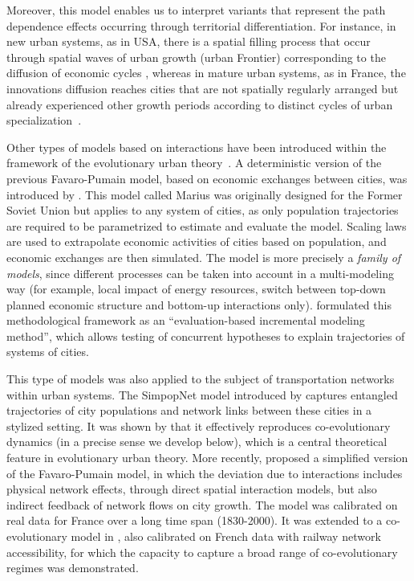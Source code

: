 \documentclass[11pt]{article}
\begin{document}
Moreover, this model enables us to interpret variants that represent the path dependence effects occurring through territorial differentiation. For instance, in new urban systems, as in USA, there is a spatial filling process that occur through spatial waves of urban growth (urban Frontier) corresponding to the diffusion of economic cycles \cite{bretagnolle2007formes}, whereas in mature urban systems, as in France, the innovations diffusion reaches cities that are not spatially regularly arranged but already experienced other growth periods according to distinct cycles of urban specialization~\cite{paulus2004coevolution,finance2016villes}.

Other types of models based on interactions have been introduced within the framework of the evolutionary urban theory~\cite{pumain2006evolutionary}. A deterministic version of the previous Favaro-Pumain model, based on economic exchanges between cities, was introduced by \cite{cottineau2014evolution}. This model called Marius was originally designed for the Former Soviet Union but applies to any system of cities, as only population trajectories are required to be parametrized to estimate and evaluate the model. Scaling laws are used to extrapolate economic activities of cities based on population, and economic exchanges are then simulated. The model is more precisely a \emph{family of models}, since different processes can be taken into account in a multi-modeling way (for example, local impact of energy resources, switch between top-down planned economic structure and bottom-up interactions only). \cite{cottineau2015growing} formulated this methodological framework as an ``evaluation-based incremental modeling method'', which allows testing of concurrent hypotheses to explain trajectories of systems of cities.

This type of models was also applied to the subject of transportation networks within urban systems. The SimpopNet model introduced by \cite{schmitt2014modelisation} captures entangled trajectories of city populations and network links between these cities in a stylized setting. It was shown by \cite{raimbault2020unveiling} that it effectively reproduces co-evolutionary dynamics (in a precise sense we develop below), which is a central theoretical feature in evolutionary urban theory. More recently, \cite{raimbault2020indirect} proposed a simplified version of the Favaro-Pumain model, in which the deviation due to interactions includes physical network effects, through direct spatial interaction models, but also indirect feedback of network flows on city growth. The model was calibrated on real data for France over a long time span (1830-2000). It was extended to a co-evolutionary model in \cite{raimbault2018modeling}, also calibrated on French data with railway network accessibility, for which the capacity to capture a broad range of co-evolutionary regimes was demonstrated.
\end{document}
